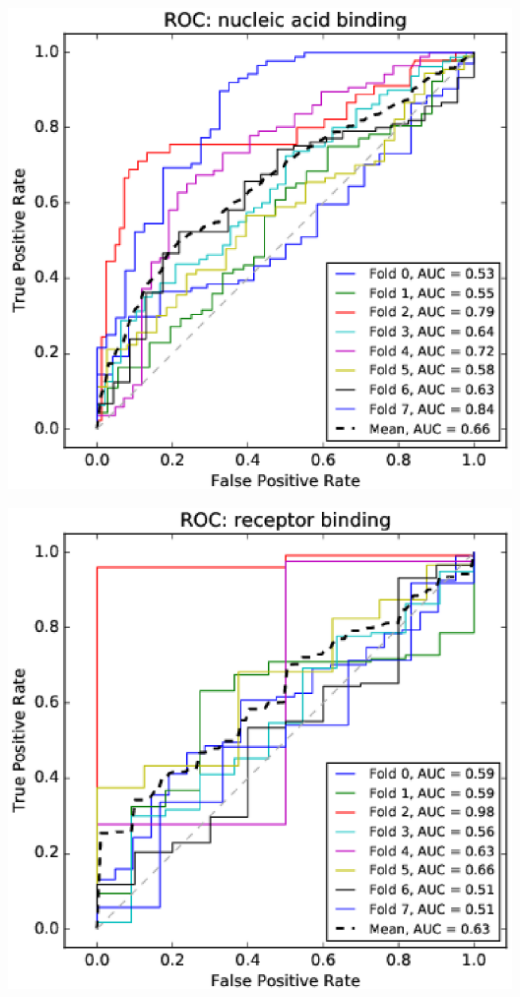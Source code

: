 \documentclass[11pt,twoside,a4paper]{book}
\newenvironment{Figure}
  {\par\medskip\noindent\minipage{\linewidth}}
  {\endminipage\par\medskip}
\begin{document}
\begin{multicols}{2}
\begin{Figure}\begin{center}\includegraphics[width=\linewidth]{figures/roc_nucleic_acid_binding}\label{fig:roc_nucleic_acid_binding}\end{center}\end{Figure}
\begin{Figure}\begin{center}\includegraphics[width=\linewidth]{figures/roc_receptor_binding}\label{fig:roc_receptor_binding}\end{center}\end{Figure}

\end{multicols}
\end{document}
